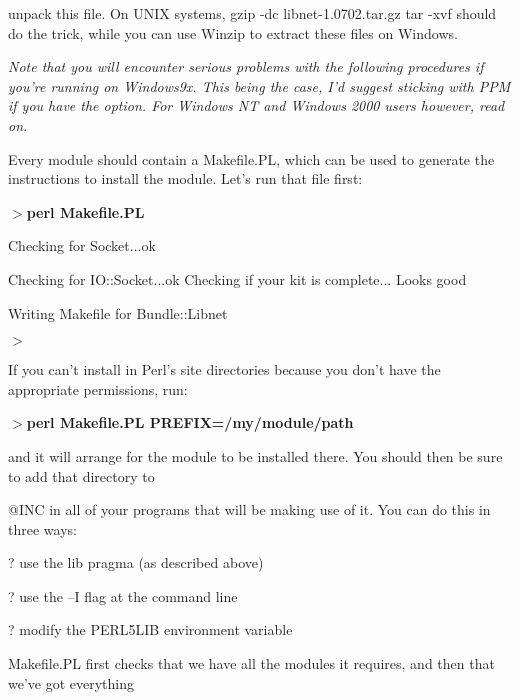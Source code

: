 \documentclass[a4paper,11pt]{book}
\begin{document}
\noindent unpack this file. On UNIX systems, gzip -dc libnet-1.0702.tar.gz \textbar  tar -xvf should do the trick, while you can use Winzip to extract these files on Windows.

\noindent 

\noindent 

\noindent \textit{Note that you will encounter serious problems with the following procedures if you're running on Windows9x. This being the case, I'd suggest sticking with PPM if you have the option. For Windows NT and Windows 2000 users however, read on.}

\noindent 

\noindent Every module should contain a Makefile.PL, which can be used to generate the instructions to install the module. Let's run that file first:

\noindent 

\noindent $>$\textbf{perl Makefile.PL}

\noindent Checking for Socket...ok

\noindent Checking for IO::Socket...ok Checking if your kit is complete... Looks good

\noindent Writing Makefile for Bundle::Libnet

\noindent $>$

\noindent 

\noindent If you can't install in Perl's site directories because you don't have the appropriate permissions, run:

\noindent 

\noindent $>$\textbf{perl Makefile.PL PREFIX=/my/module/path}

\noindent 

\noindent and it will arrange for the module to be installed there. You should then be sure to add that directory to

\noindent @INC in all of your programs that will be making use of it. You can do this in three ways:

\noindent 

\noindent ? use the lib pragma (as described above)

\noindent 

\noindent ? use the --I flag at the command line

\noindent 

\noindent ? modify the PERL5LIB environment variable

\noindent 

\noindent Makefile.PL first checks that we have all the modules it requires, and then that we've got everything
\end{document}
